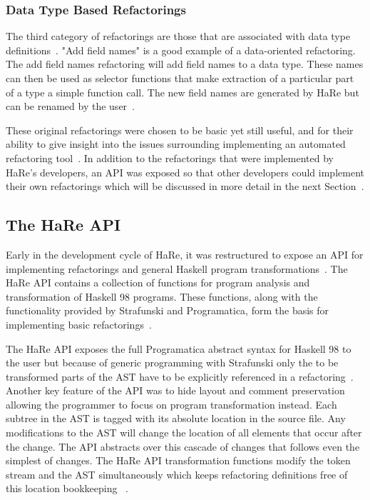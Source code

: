 \subsubsection{Data Type Based Refactorings}

The third category of refactorings are those that are associated with data type definitions~\citep{huiqingThesis}. "Add field names" is a good example of a data-oriented refactoring.  The add field names refactoring will add field names to a data type. These names can then be used as selector functions that make extraction of a particular part of a type a simple function call. The new field names are generated by HaRe but can be renamed by the user~\citep{huiqingThesis}.

These original refactorings were chosen to be basic yet still useful, and for their ability to give insight into the issues surrounding implementing an automated refactoring tool~\citep{huiqingThesis}. In addition to the refactorings that were implemented by HaRe's developers, an API was exposed so that other developers could implement their own refactorings which will be discussed in more detail in the next Section~\citep{hareApi}.


\subsection{The HaRe API}\label{hareApi}

Early in the development cycle of HaRe, it was restructured to expose an API for implementing refactorings and general Haskell program transformations~\citep{hareApi}. The HaRe API contains a collection of functions for program analysis and transformation of Haskell 98 programs. These functions, along with the functionality provided by Strafunski and Programatica, form the basis for implementing basic refactorings~\citep{hareApi}.

The HaRe API exposes the full Programatica abstract syntax for Haskell 98 to the user but because of generic programming with Strafunski only the to be transformed parts of the AST have to be explicitly referenced in a refactoring~\citep{hareApi}. Another key feature of the API was to hide layout and comment preservation allowing the programmer to focus on program transformation instead. Each subtree in the AST is tagged with its absolute location in the source file. Any modifications to the AST will change the location of all elements that occur after the change. The API abstracts over this cascade of changes that follows even the simplest of changes. The HaRe API transformation functions modify the token stream and the AST simultaneously which keeps refactoring definitions free of this location bookkeeping ~\citep{hareApi}. 

